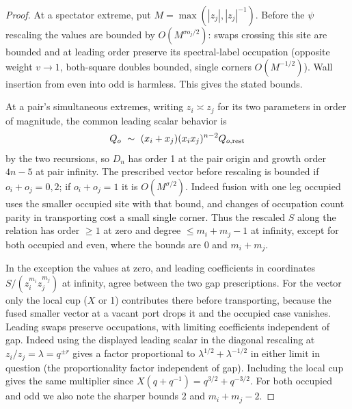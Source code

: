 \begin{proof}
At a spectator extreme, put \(M=\max(|z_j|,|z_j|^{-1})\). Before the \(\psi\) rescaling the values are bounded by \(O(M^{\sigma o_j/2})\): swaps crossing this site are bounded and at leading order preserve its spectral-label occupation (opposite weight \(v\to1\), both-square doubles bounded, single corners \(O(M^{-1/2})\)). Wall insertion from even into odd is harmless. This gives the stated bounds.

At a pair's simultaneous extremes, writing \(z_i\asymp z_j\) for its two parameters in order of magnitude, the common leading scalar behavior is
\[
 Q_o\ \sim\ (x_i+x_j)(x_i x_j)^{n-2} Q_{o,{\rm rest}}
\]
by the two recursions, so \(D_n\) has order 1 at the pair origin and growth order \(4n-5\) at pair infinity. The prescribed vector before rescaling is bounded if \(o_i+o_j=0,2\); if \(o_i+o_j=1\) it is \(O(M^{\sigma/2})\). Indeed fusion with one leg occupied uses the smaller occupied site with that bound, and changes of occupation count parity in transporting cost a small single corner. Thus the rescaled \(S\) along the relation has order \(\ge1\) at zero and degree \(\le m_i+m_j-1\) at infinity, except for both occupied and even, where the bounds are 0 and \(m_i+m_j\). 

In the exception the values at zero, and leading coefficients in coordinates \(S/(z_i^{m_i}z_j^{m_j})\) at infinity, agree between the two gap prescriptions. For the vector only the local cup (\(X\) or 1) contributes there before transporting, because the fused smaller vector at a vacant port drops it and the occupied case vanishes. Leading swaps preserve occupations, with limiting coefficients independent of gap. Indeed using the displayed leading scalar in the diagonal rescaling at \(z_i/z_j=\lambda=q^{\pm r}\) gives a factor proportional to \(\lambda^{1/2}+\lambda^{-1/2}\) in either limit in question (the proportionality factor independent of gap). Including the local cup gives the same multiplier since \(X(q+q^{-1})=q^{3/2}+q^{-3/2}\). For both occupied and odd we also note the sharper bounds 2 and \(m_i+m_j-2\).


\end{proof}
